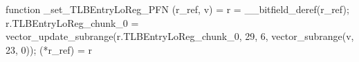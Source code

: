 function _set_TLBEntryLoReg_PFN (r_ref, v) = {
    r = __bitfield_deref(r_ref);
    r.TLBEntryLoReg_chunk_0 = vector_update_subrange(r.TLBEntryLoReg_chunk_0, 29, 6, vector_subrange(v, 23, 0));
    (*r_ref) = r
}
